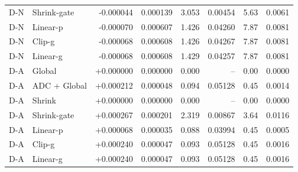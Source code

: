 \begin{table}[htbp]
\begin{tabular}{llrrrrrr}
D-N & Shrink-gate & -0.000044 & 0.000139 & 3.053 & 0.00454 & 5.63 & 0.0061\\
D-N & Linear-p & -0.000070 & 0.000607 & 1.426 & 0.04260 & 7.87 & 0.0081\\
D-N & Clip-g & -0.000068 & 0.000608 & 1.426 & 0.04267 & 7.87 & 0.0081\\
D-N & Linear-g & -0.000068 & 0.000608 & 1.429 & 0.04257 & 7.87 & 0.0081\\
\midrule
D-A & Global & +0.000000 & 0.000000 & 0.000 & -- & 0.00 & 0.0000\\
D-A & ADC + Global & +0.000212 & 0.000048 & 0.094 & 0.05128 & 0.45 & 0.0014\\
D-A & Shrink & +0.000000 & 0.000000 & 0.000 & -- & 0.00 & 0.0000\\
D-A & Shrink-gate & +0.000267 & 0.000201 & 2.319 & 0.00867 & 3.64 & 0.0116\\
D-A & Linear-p & +0.000068 & 0.000035 & 0.088 & 0.03994 & 0.45 & 0.0005\\
D-A & Clip-g & +0.000240 & 0.000047 & 0.093 & 0.05128 & 0.45 & 0.0016\\
D-A & Linear-g & +0.000240 & 0.000047 & 0.093 & 0.05128 & 0.45 & 0.0016\\
\bottomrule
\end{tabular}
\end{table}
